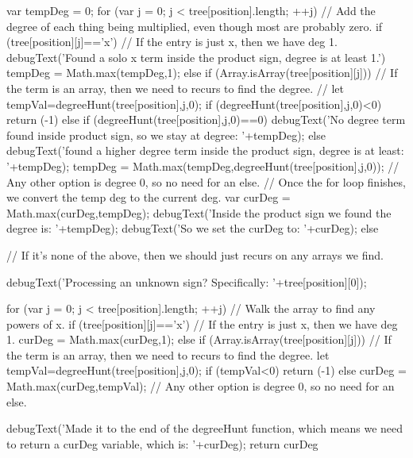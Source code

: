 \documentclass{ximera}
\begin{document}
\begin{javascript}
{{        var tempDeg = 0;
        for (var j = 0; j < tree[position].length; ++j) {
            // Add the degree of each thing being multiplied, even though most are probably zero.
            if (tree[position][j]=='x') {
                // If the entry is just x, then we have deg 1.
                debugText('Found a solo x term inside the product sign, degree is at least 1.')
                tempDeg = Math.max(tempDeg,1);
            } else if (Array.isArray(tree[position][j])) {
                // If the term is an array, then we need to recurs to find the degree.
                // let tempVal=degreeHunt(tree[position],j,0);
                if (degreeHunt(tree[position],j,0)<0) { 
                    return (-1)
                } else if (degreeHunt(tree[position],j,0)==0){
                    debugText('No degree term found inside product sign, so we stay at degree: '+tempDeg);
                } else {
                    debugText('found a higher degree term inside the product sign, degree is at least: '+tempDeg);
                    tempDeg = Math.max(tempDeg,degreeHunt(tree[position],j,0));
                }
            }// Any other option is degree 0, so no need for an else.
        }
        // Once the for loop finishes, we convert the temp deg to the current deg.
        var curDeg = Math.max(curDeg,tempDeg);
        debugText('Inside the product sign we found the degree is: '+tempDeg);
        debugText('So we set the curDeg to: '+curDeg);
    } else {
        // If it's none of the above, then we should just recurs on any arrays we find.
        
        debugText('Processing an unknown sign? Specifically: '+tree[position][0]);
        
        for (var j = 0; j < tree[position].length; ++j) {
            // Walk the array to find any powers of x.
            if (tree[position][j]=='x') {
                // If the entry is just x, then we have deg 1.
                curDeg = Math.max(curDeg,1);
            } else if (Array.isArray(tree[position][j])) {
                // If the term is an array, then we need to recurs to find the degree.
                let tempVal=degreeHunt(tree[position],j,0);
                if (tempVal<0) { return (-1)} else {
                    curDeg = Math.max(curDeg,tempVal);
                }
            }// Any other option is degree 0, so no need for an else.
        }
        
    }
    debugText('Made it to the end of the degreeHunt function, which means we need to return a curDeg variable, which is: '+curDeg);
    return curDeg
}


\end{javascript}
\end{document}
